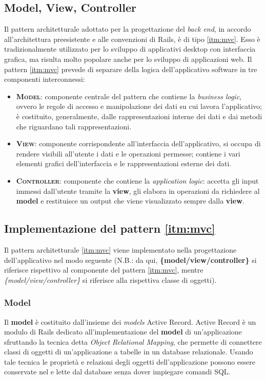 \subsection{Model, View, Controller}
Il pattern architetturale adottato per la progettazione del \textit{back end}, in accordo all'architettura preesistente e alle convenzioni di Rails, è di tipo \ref{itm:mvc}. Esso è tradizionalmente utilizzato per lo sviluppo di applicativi desktop con interfaccia grafica, ma risulta molto popolare anche per lo sviluppo di applicazioni web. Il pattern \ref{itm:mvc} prevede di separare della logica dell'applicativo software in tre componenti interconnessi:
\begin{itemize}
    \item \textsc{\textbf{Model}}: componente centrale del pattern che contiene la \textit{business logic}, ovvero le regole di accesso e manipolazione dei dati su cui lavora l'applicativo; è costituito, generalmente, dalle rappresentazioni interne dei dati e dai metodi che riguardano tali rappresentazioni.
    \item \textsc{\textbf{View}}: componente corrispondente all'interfaccia dell'applicativo, si occupa di rendere visibili all'utente i dati e le operazioni permesse; contiene i vari elementi grafici dell'interfaccia e le rappresentazioni esterne dei dati.
    \item \textsc{\textbf{Controller}}: componente che contiene la \textit{application logic}: accetta gli input immessi dall'utente tramite la \textbf{view}, gli elabora in operazioni da richiedere al \textbf{model} e restituisce un output che viene visualizzato sempre dalla \textbf{view}.
\end{itemize}

\subsection{Implementazione del pattern \ref{itm:mvc}}
Il pattern architetturale \ref{itm:mvc} viene implementato nella progettazione dell'applicativo nel modo seguente (N.B.: da qui, \textbf{\{model/view/controller\}} si riferisce rispettivo al componente del pattern \ref{itm:mvc}, mentre \textit{\{model/view/controller\}} si riferisce alla rispettiva classe di oggetti).

\subsubsection{Model}
Il \textbf{model} è costituito dall'insieme dei \textit{models} Active Record. Active Record è un modulo di Rails dedicato all'implementazione del \textbf{model} di un'applicazione sfruttando la tecnica detta \textit{Object Relational Mapping}, che permette di connettere classi di oggetti di un'applicazione a tabelle in un database relazionale. Usando tale tecnica le proprietà e relazioni degli oggetti dell'applicazione possono essere conservate nel e lette dal database senza dover impiegare comandi SQL.

